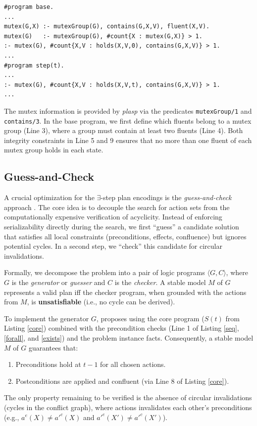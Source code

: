 \documentclass[
     11pt,                    %
     a4paper,             %
     BCOR=10mm,     %
     DIV=14,                 %
     listof=totoc,                    %
     bibliography=totoc,       %
     index=totoc,              %
     parskip            %
     twoside,
     headsepline
     ]{scrreprt}
\theoremstyle{definition}
\theoremstyle{definition}
\theoremstyle{remark}
\theoremstyle{bfnote}
\begin{document}
\begin{listing}[H]
\caption{Expansion for Mutex Groups}
\begin{verbatim}
#program base.
...
mutex(G,X) :- mutexGroup(G), contains(G,X,V), fluent(X,V).
mutex(G)   :- mutexGroup(G), #count{X : mutex(G,X)} > 1.
:- mutex(G), #count{X,V : holds(X,V,0), contains(G,X,V)} > 1.
...
#program step(t).
...
:- mutex(G), #count{X,V : holds(X,V,t), contains(G,X,V)} > 1.
...
\end{verbatim}
\label{mutex}
\end{listing}

The mutex information is provided by \textit{plasp} via the predicates \texttt{mutexGroup/1} and \texttt{contains/3}.
In the base program, we first define which fluents belong to a mutex group (Line 3), where a group must contain at least two fluents (Line 4).
Both integrity constraints in Line 5 and 9 ensures that no more than one fluent of each mutex group holds in each state.

\subsection{Guess-and-Check}
A crucial optimization for the $\exists$-step plan encodings is the \textit{guess-and-check} approach \parencite{eiter2006}. 
The core idea is to decouple the search for action sets from the computationally expensive verification of acyclicity.
Instead of enforcing serializability directly during the search, we first \enquote{guess} a candidate solution that satisfies all local constraints (preconditions, effects, confluence) but ignores potential cycles. In a second step, we \enquote{check} this candidate for circular invalidations.

Formally, we decompose the problem into a pair of logic programs $\langle G, C \rangle$, where $G$ is the \textit{generator} or \textit{guesser} and $C$ is the \textit{checker}.
A stable model $M$ of $G$ represents a valid plan iff the checker program, when grounded with the actions from $M$, is \textbf{unsatisfiable} (i.e., no cycle can be derived).

To implement the generator $G$, \textcite{DIMOPOULOS_2019} proposes using the core program ($S(t)$ from Listing \ref{core}) combined with the precondition checks (Line 1 of Listing \ref{seq}, \ref{forall}, and \ref{exists}) and the problem instance facts.
Consequently, a stable model $M$ of $G$ guarantees that:
\begin{enumerate}
    \item Preconditions hold at $t-1$ for all chosen actions.
    \item Postconditions are applied and confluent (via Line 8 of Listing \ref{core}).
\end{enumerate}
The only property remaining to be verified is the absence of circular invalidations (cycles in the conflict graph), where actions invalidates each other's preconditions (e.g., $a^e(X) \neq a'^c(X)$ and $a'^e(X') \neq a'^c(X')$).
\end{document}
